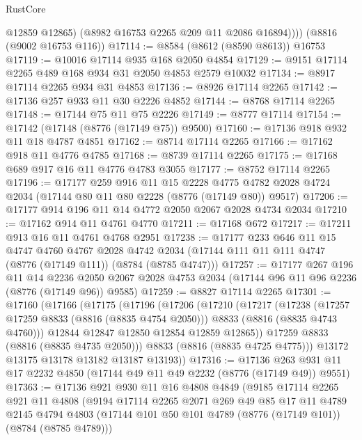 \begin{lexlean}{RustCore}
\begin{coremodule}
            @12859
            @12865)
          (@8982 @16753 @2265 @209 @11 @2086 @16894))))
    (@8816 (@9002 @16753 @116))
@17114 := @8584 (@8612 (@8590 @8613)) @16753
@17119 := @10016 @17114 @935 @168 @2050 @4854
@17129 := @9151 @17114 @2265 @489 @168 @934 @31 @2050 @4853 @2579 @10032
@17134 := @8917 @17114 @2265 @934 @31 @4853
@17136 := @8926 @17114 @2265
@17142 := @17136 @257 @933 @11 @30 @2226 @4852
@17144 := @8768 @17114 @2265
@17148 := @17144 @75 @11 @75 @2226
@17149 := @8777 @17114
@17154 := @17142 (@17148 (@8776 (@17149 @75)) @9500)
@17160 := @17136 @918 @932 @11 @18 @4787 @4851
@17162 := @8714 @17114 @2265
@17166 := @17162 @918 @11 @4776 @4785
@17168 := @8739 @17114 @2265
@17175 := @17168 @689 @917 @16 @11 @4776 @4783 @3055
@17177 := @8752 @17114 @2265
@17196 := @17177
    @259
    @916
    @11
    @15
    @2228
    @4775
    @4782
    @2028
    @4724
    @2034
    (@17144 @80 @11 @80 @2228 (@8776 (@17149 @80)) @9517)
@17206 := @17177 @914 @196 @11 @14 @4772 @2050 @2067 @2028 @4734 @2034
@17210 := @17162 @914 @11 @4761 @4770
@17211 := @17168 @672
@17217 := @17211 @913 @16 @11 @4761 @4768 @2951
@17238 := @17177
    @233
    @646
    @11
    @15
    @4747
    @4760
    @4767
    @2028
    @4742
    @2034
    (@17144 @111 @11 @111 @4747 (@8776 (@17149 @111)) (@8784 (@8785 @4747)))
@17257 := @17177
    @267
    @196
    @11
    @14
    @2236
    @2050
    @2067
    @2028
    @4753
    @2034
    (@17144 @96 @11 @96 @2236 (@8776 (@17149 @96)) @9585)
@17259 := @8827 @17114 @2265
@17301 := @17160
    (@17166
      (@17175
        (@17196
          (@17206
            (@17210
              (@17217
                (@17238
                  (@17257 @17259 @8833 (@8816 (@8835 @4754 @2050)))
                  @8833
                  (@8816 (@8835 @4743 @4760)))
                @12844
                @12847
                @12850
                @12854
                @12859
                @12865))
            @17259
            @8833
            (@8816 (@8835 @4735 @2050)))
          @8833
          (@8816 (@8835 @4725 @4775)))
        @13172
        @13175
        @13178
        @13182
        @13187
        @13193))
@17316 := @17136 @263 @931 @11 @17 @2232 @4850 (@17144 @49 @11 @49 @2232 (@8776 (@17149 @49)) @9551)
@17363 := @17136
    @921
    @930
    @11
    @16
    @4808
    @4849
    (@9185
      @17114
      @2265
      @921
      @11
      @4808
      (@9194
        @17114
        @2265
        @2071
        @269
        @49
        @85
        @17
        @11
        @4789
        @2145
        @4794
        @4803
        (@17144 @101 @50 @101 @4789 (@8776 (@17149 @101)) (@8784 (@8785 @4789)))

\end{coremodule}
\end{lexlean}
